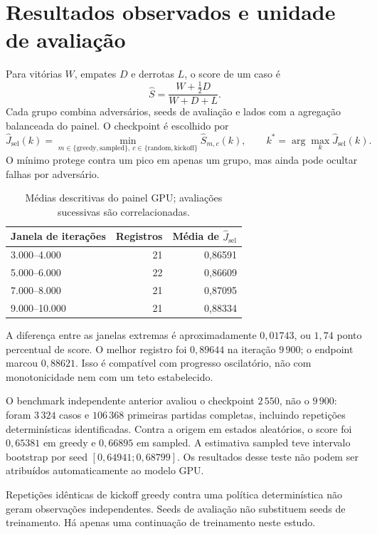 \documentclass[11pt,a4paper]{article}
\begin{document}
\section{Resultados observados e unidade de avaliação}
Para vitórias $W$, empates $D$ e derrotas $L$, o score de um caso é
\begin{equation}
 \widehat S=\frac{W+\tfrac12D}{W+D+L}.
\end{equation}
Cada grupo combina adversários, seeds de avaliação e lados com a agregação balanceada do painel. O checkpoint é escolhido por
\begin{equation}
 \widehat J_{\mathrm{sel}}(k)=\min_{m\in\{\mathrm{greedy},\mathrm{sampled}\},\ c\in\{\mathrm{random},\mathrm{kickoff}\}}
 \widehat S_{m,c}(k),\qquad
 k^*=\arg\max_k\widehat J_{\mathrm{sel}}(k).
\end{equation}
O mínimo protege contra um pico em apenas um grupo, mas ainda pode ocultar falhas por adversário.

\begin{table}[htbp]\centering
\caption{Médias descritivas do painel GPU; avaliações sucessivas são correlacionadas.}
\begin{tabular}{@{}lrr@{}}\toprule
Janela de iterações & Registros & Média de $\widehat J_{\mathrm{sel}}$\\\midrule
3.000--4.000 & 21 & 0,86591\\
5.000--6.000 & 22 & 0,86609\\
7.000--8.000 & 21 & 0,87095\\
9.000--10.000 & 21 & 0,88334\\\bottomrule
\end{tabular}
\end{table}
A diferença entre as janelas extremas é aproximadamente $0{,}01743$, ou $1{,}74$ ponto percentual de score. O melhor registro foi $0{,}89644$ na iteração $9\,900$; o endpoint marcou $0{,}88621$. Isso é compatível com progresso oscilatório, não com monotonicidade nem com um teto estabelecido.

O benchmark independente anterior avaliou o checkpoint $2\,550$, não o $9\,900$: foram $3\,324$ casos e $106\,368$ primeiras partidas completas, incluindo repetições determinísticas identificadas. Contra a origem em estados aleatórios, o score foi $0{,}65381$ em greedy e $0{,}66895$ em sampled. A estimativa sampled teve intervalo bootstrap por seed $[0{,}64941;0{,}68799]$. Os resultados desse teste não podem ser atribuídos automaticamente ao modelo GPU.

Repetições idênticas de kickoff greedy contra uma política determinística não geram observações independentes. Seeds de avaliação não substituem seeds de treinamento. Há apenas uma continuação de treinamento neste estudo.
\end{document}
